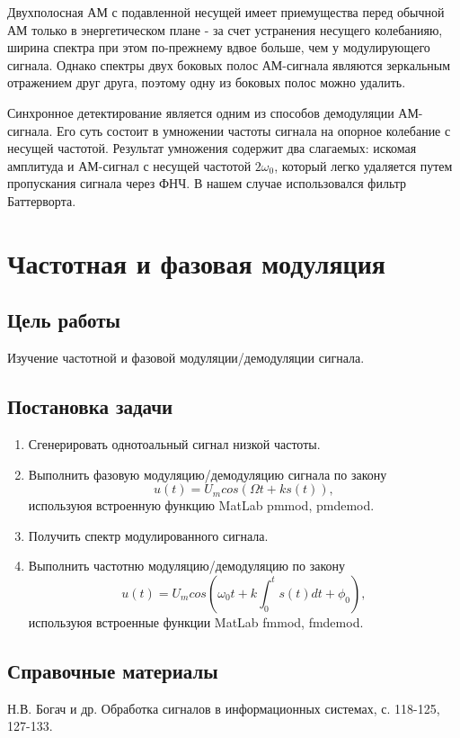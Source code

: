 \documentclass[10pt,a4paper]{article}
\begin{document}
Двухполосная АМ с подавленной несущей имеет приемущества перед обычной АМ только в энергетическом плане - за счет устранения несущего колебанияю, ширина спектра при этом по-прежнему вдвое больше, чем у модулирующего сигнала. Однако спектры двух боковых полос АМ-сигнала являются зеркальным отражением друг друга, поэтому одну из боковых полос можно удалить.

Синхронное детектирование является одним из способов демодуляции АМ-сигнала. Его суть состоит в умножении частоты сигнала на опорное колебание с несущей частотой. Результат умножения содержит два слагаемых: искомая амплитуда и АМ-сигнал с несущей частотой $2\omega_0$, который легко удаляется путем пропускания сигнала через ФНЧ. В нашем случае использовался фильтр Баттерворта.

\newpage
\section{Частотная и фазовая модуляция}

\subsection{Цель работы}
Изучение частотной и фазовой модуляции/демодуляции сигнала.

\subsection{Постановка задачи}
	\begin{enumerate}
		\item Сгенерировать однотоальный сигнал низкой частоты.
		\item Выполнить фазовую модуляцию/демодуляцию сигнала по закону
				\begin{equation}
					u(t) = U_m cos(\Omega t + ks(t)),
				\end{equation}
		используюя встроенную функцию MatLab pmmod, pmdemod.
		\item Получить спектр модулированного сигнала.
		\item Выполнить частотню модуляцию/демодуляцию по закону
				\begin{equation}
					u(t) = U_m cos(\omega_0 t + k \int_0^t s(t) dt + \phi_0),
				\end{equation}
		используюя встроенные функции MatLab fmmod, fmdemod.
	\end{enumerate}

\subsection{Справочные материалы}
Н.В. Богач и др. Обработка сигналов в информационных системах, с. 118-125, 127-133.
\end{document}
